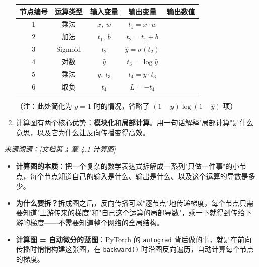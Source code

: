 \documentclass[a4paper,11pt]{ctexart}
\begin{document}
\begin{problembox}
\begin{enumerate}[(1)]
        \begin{center}
        \begin{tabular}{ccccc}
            \toprule
            节点编号 & 运算类型 & 输入变量 & 输出变量 & 输出数值 \\
            \midrule
            1 & 乘法 & $x,\ w$ & $t_1 = x \cdot w$ & \underline{\hspace{1.5cm}} \\
            2 & 加法 & $t_1,\ b$ & $t_2 = t_1 + b$ & \underline{\hspace{1.5cm}} \\
            3 & Sigmoid & $t_2$ & $\hat{y} = \sigma(t_2)$ & \underline{\hspace{1.5cm}} \\
            4 & 对数 & $\hat{y}$ & $t_3 = \log \hat{y}$ & \underline{\hspace{1.5cm}} \\
            5 & 乘法 & $y,\ t_3$ & $t_4 = y \cdot t_3$ & \underline{\hspace{1.5cm}} \\
            6 & 取负 & $t_4$ & $L = -t_4$ & \underline{\hspace{1.5cm}} \\
            \bottomrule
        \end{tabular}
        \end{center}
        （注：此处简化为 $y=1$ 时的情况，省略了 $(1-y)\log(1-\hat{y})$ 项）

        \item 计算图有两个核心优势：\textbf{模块化}和\textbf{局部计算}。用一句话解释"局部计算"是什么意思，以及它为什么让反向传播变得高效。
    \end{enumerate}

    \vspace{0.2cm}
    {\color{gray}\small\textit{来源溯源：[文档第 4 章 4.1 计算图]}}
\end{problembox}

\begin{beginnerbox}
    \begin{itemize}
        \item \textbf{计算图的本质}：把一个复杂的数学表达式拆解成一系列"只做一件事"的小节点，每个节点知道自己的输入是什么、输出是什么、以及这个运算的导数是多少。
        \item \textbf{为什么要拆？}拆成图之后，反向传播可以"逐节点"地传递梯度，每个节点只需要知道"上游传来的梯度"和"自己这个运算的局部导数"，乘一下就得到传给下游的梯度——不需要知道整个网络的全局结构。
        \item \textbf{计算图 = 自动微分的蓝图}：PyTorch 的 \texttt{autograd} 背后做的事，就是在前向传播时悄悄构建这张图，在 \texttt{backward()} 时沿图反向遍历，自动计算每个节点的梯度。
    \end{itemize}
\end{beginnerbox}
\end{document}
